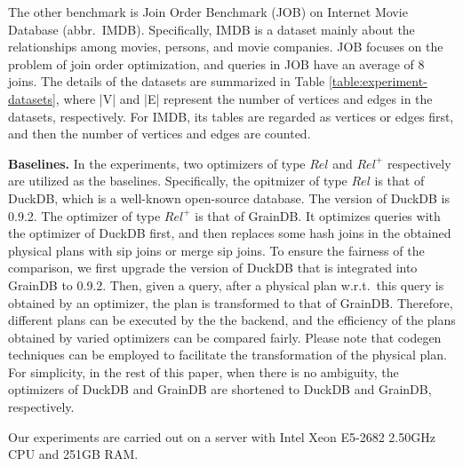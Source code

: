 The other benchmark is Join Order Benchmark (JOB) on Internet Movie Database (abbr.~IMDB).
Specifically, IMDB is a dataset mainly about the relationships among movies, persons, and movie companies.
JOB focuses on the problem of join order optimization, and queries in JOB have an average of 8 joins.
The details of the datasets are summarized in Table \ref{table:experiment-datasets}, where |V| and |E| represent the number of vertices and edges in the datasets, respectively.
For IMDB, its tables are regarded as vertices or edges first, and then the number of vertices and edges are counted.

\textbf{Baselines. }
In the experiments, two optimizers of type $Rel$ and $Rel^+$ respectively are utilized as the baselines.
Specifically, the opitmizer of type $Rel$ is that of DuckDB, which is a well-known open-source database.
The version of DuckDB is 0.9.2.
The optimizer of type $Rel^+$ is that of GrainDB.
It optimizes queries with the optimizer of DuckDB first, and then replaces some hash joins in the obtained physical plans with sip joins or merge sip joins.
To ensure the fairness of the comparison, we first upgrade the version of DuckDB that is integrated into GrainDB to 0.9.2.
Then, given a query, after a physical plan w.r.t.~this query is obtained by an optimizer, the plan is transformed to that of GrainDB.
Therefore, different plans can be executed by the the backend, and the efficiency of the plans obtained by varied optimizers can be compared fairly.
Please note that codegen techniques can be employed to facilitate the transformation of the physical plan.
For simplicity, in the rest of this paper, when there is no ambiguity, the optimizers of DuckDB and GrainDB are shortened to DuckDB and GrainDB, respectively.

Our experiments are carried out on a server with Intel Xeon E5-2682 2.50GHz CPU and 251GB RAM.

